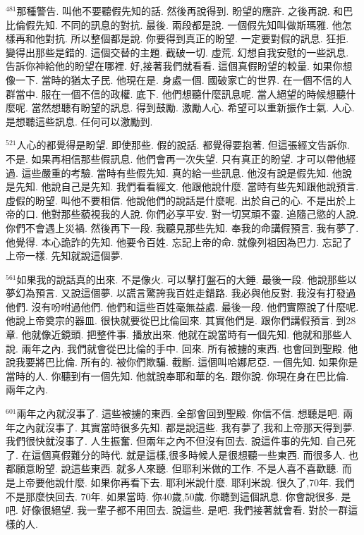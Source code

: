 \documentclass{book}
\begin{document}
$^{481}$那種警告.
叫他不要聽假先知的話.
然後再說得到.
盼望的應許.
之後再說.
和巴比倫假先知.
不同的訊息的對抗.
最後.
兩段都是說.
一個假先知叫做斯瑪雅.
他怎樣再和他對抗.
所以整個都是說.
你要得到真正的盼望.
一定要對假的訊息.
狂拒.
變得出那些是錯的.
這個交替的主題.
截破一切.
虛荒.
幻想自我安慰的一些訊息.
告訴你神給他的盼望在哪裡.
好,接著我們就看看.
這個真假盼望的較量.
如果你想像一下.
當時的猶太子民.
他現在是.
身處一個.
國破家亡的世界.
在一個不信的人群當中.
服在一個不信的政權.
底下.
他們想聽什麼訊息呢.
當人絕望的時候想聽什麼呢.
當然想聽有盼望的訊息.
得到鼓勵.
激勵人心.
希望可以重新振作士氣.
人心.
是想聽這些訊息.
任何可以激勵到.

$^{521}$人心的都覺得是盼望.
即使那些.
假的說話.
都覺得要抱著.
但這張經文告訴你.
不是.
如果再相信那些假訊息.
他們會再一次失望.
只有真正的盼望.
才可以帶他經過.
這些嚴重的考驗.
當時有些假先知.
真的給一些訊息.
他沒有說是假先知.
他說是先知.
他說自己是先知.
我們看看經文.
他跟他說什麼.
當時有些先知跟他說預言.
虛假的盼望.
叫他不要相信.
他說他們的說話是什麼呢.
出於自己的心.
不是出於上帝的口.
他對那些藐視我的人說.
你們必享平安.
對一切冥頑不靈.
追隨己慾的人說.
你們不會遇上災禍.
然後再下一段.
我聽見那些先知.
奉我的命講假預言.
我有夢了.
他覺得.
本心詭詐的先知.
他要令百姓.
忘記上帝的命.
就像列祖因為巴力.
忘記了上帝一樣.
先知就說這個夢.

$^{561}$如果我的說話真的出來.
不是像火.
可以擊打盤石的大錘.
最後一段.
他說那些以夢幻為預言.
又說這個夢.
以謊言驚誇我百姓走錯路.
我必與他反對.
我沒有打發過他們.
沒有吩咐過他們.
他們和這些百姓毫無益處.
最後一段.
他們實際說了什麼呢.
他說上帝奠宗的器皿.
很快就要從巴比倫回來.
其實他們是.
跟你們講假預言.
到28章.
他就像近鏡頭.
把整件事.
播放出來.
他就在說當時有一個先知.
他就和那些人說.
兩年之內.
我們就會從巴比倫的手中.
回來.
所有被擄的東西.
也會回到聖殿.
他說我要將巴比倫.
所有的.
被你們欺騙.
截斷.
這個叫哈娜尼亞.
一個先知.
如果你是當時的人.
你聽到有一個先知.
他就說奉耶和華的名.
跟你說.
你現在身在巴比倫.
兩年之內.

$^{601}$兩年之內就沒事了.
這些被擄的東西.
全部會回到聖殿.
你信不信.
想聽是吧.
兩年之內就沒事了.
其實當時很多先知.
都是說這些.
我有夢了,我和上帝那天得到夢.
我們很快就沒事了.
人生振奮.
但兩年之內不但沒有回去.
說這件事的先知.
自己死了.
在這個真假難分的時代.
就是這樣,很多時候人是很想聽一些東西.
而很多人.
也都願意盼望.
說這些東西.
就多人來聽.
但耶利米做的工作.
不是人喜不喜歡聽.
而是上帝要他說什麼.
如果你再看下去.
耶利米說什麼.
耶利米說.
很久了,70年.
我們不是那麼快回去.
70年.
如果當時.
你40歲,50歲.
你聽到這個訊息.
你會說很多.
是吧.
好像很絕望.
我一輩子都不用回去.
說這些.
是吧.
我們接著就會看.
對於一群這樣的人.
\end{document}
